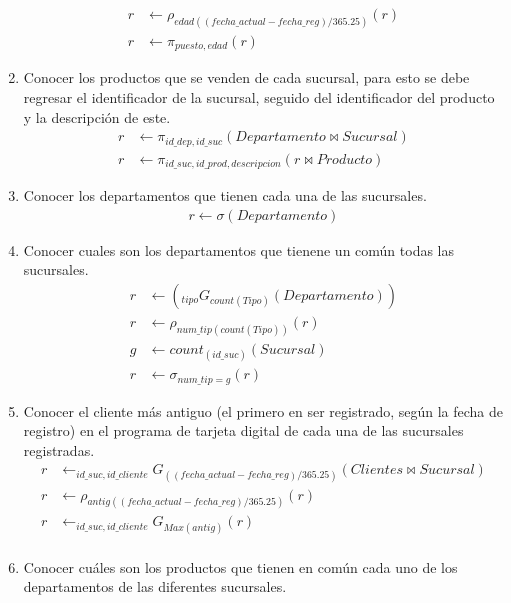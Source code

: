 \documentclass{article}
\begin{document}
\begin{enumerate}
{\begin{align*}
                r &\leftarrow \rho_{edad((fecha\_actual-fecha\_reg)/365.25)}(r) \\
                r &\leftarrow \pi_{puesto, edad}(r)
            \end{align*}
        }
        \item {
            Conocer los productos que se venden de cada sucursal, para esto se 
            debe regresar el identificador de la sucursal, seguido del
            identificador del producto y la descripción de este.
            \begin{align*}
                r &\leftarrow \pi_{id\_dep, id\_suc}(Departamento \bowtie Sucursal)\\
                r &\leftarrow \pi_{id\_suc, id\_prod, descripcion}(r \bowtie Producto)
            \end{align*}
        }
        \item {
            Conocer los departamentos que tienen cada una de las sucursales.
            \begin{align*}
                r \leftarrow \sigma(Departamento)
            \end{align*}
        }
        \item {
            Conocer cuales son los departamentos que tienene un común todas las 
            sucursales.
            \begin{align*}
                r &\leftarrow (_{tipo}G_{count(Tipo)}(Departamento)) \\
                r &\leftarrow \rho_{num\_tip(count(Tipo))}(r) \\
                g &\leftarrow count_{(id\_suc)}(Sucursal) \\
                r &\leftarrow \sigma_{num\_tip = g}(r)
            \end{align*}
        }
        \item {
            Conocer el cliente más antiguo (el primero en ser registrado, según
            la fecha de registro) en el programa de tarjeta digital de cada una
            de las sucursales registradas.
            \begin{align*}
            r &\leftarrow _{id\_suc,id\_cliente}G_{((fecha\_actual-fecha\_reg)/365.25)}(Clientes \bowtie Sucursal)\\
            r &\leftarrow \rho_{antig((fecha\_actual-fecha\_reg)/365.25)}(r)\\
            r &\leftarrow _{id\_suc,id\_cliente}G_{Max(antig)} (r) \\           
            \end{align*}
        }
        \item {
            Conocer cuáles son los productos que tienen en común cada uno de los
            departamentos de las diferentes sucursales.
            
}
\end{enumerate}
\end{document}
